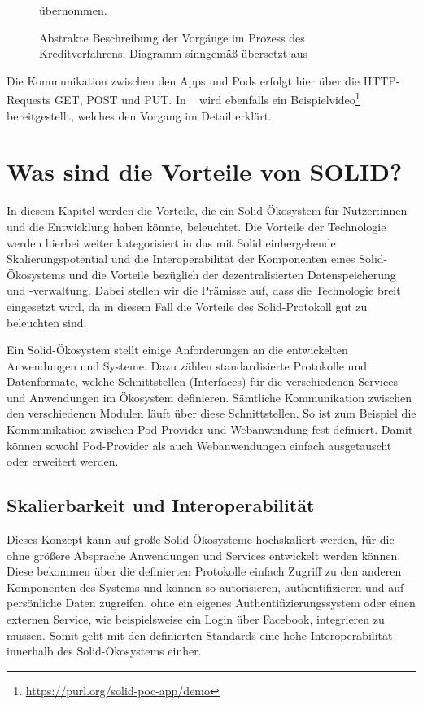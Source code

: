 \documentclass[acmtog]{acmart}
\begin{document}
\begin{figure}
\label{fig:enterprise_example}
\centering

\caption{Abstrakte Beschreibung der Vorgänge im Prozess des Kreditverfahrens. Diagramm sinngemäß übersetzt aus ~\cite{DBLP:conf/i-semantics/HenselmannKSS0H22}} übernommen.
\end{figure}

Die Kommunikation zwischen den Apps und Pods erfolgt hier über die HTTP-Requests GET, POST und PUT.
In ~\cite{DBLP:conf/i-semantics/HenselmannKSS0H22} wird ebenfalls ein Beispielvideo\footnote{\url{https://purl.org/solid-poc-app/demo}} bereitgestellt, welches den Vorgang im Detail erklärt.

\section{Was sind die Vorteile von SOLID?} \label{section:wasSindDieVorteileVonSolid}
 
In diesem Kapitel werden die Vorteile, die ein Solid-Ökosystem für Nutzer:innen und die Entwicklung haben könnte, beleuchtet. Die Vorteile der Technologie werden hierbei weiter kategorisiert in das mit Solid einhergehende Skalierungspotential und die Interoperabilität der Komponenten eines Solid-Ökosystems und die Vorteile bezüglich der dezentralisierten Datenspeicherung und -verwaltung. Dabei stellen wir die Prämisse auf, dass die Technologie breit eingesetzt wird, da in diesem Fall die Vorteile des Solid-Protokoll gut zu beleuchten sind.

Ein Solid-Ökosystem stellt einige Anforderungen an die entwickelten Anwendungen und Systeme. Dazu zählen standardisierte Protokolle und Datenformate, welche Schnittstellen (Interfaces) für die verschiedenen Services und Anwendungen im Ökosystem definieren. Sämtliche Kommunikation zwischen den verschiedenen Modulen läuft über diese Schnittstellen. So ist zum Beispiel die Kommunikation zwischen Pod-Provider und Webanwendung fest definiert. Damit können sowohl Pod-Provider als auch Webanwendungen einfach ausgetauscht oder erweitert werden. 

\subsection{Skalierbarkeit und Interoperabilität} \label{subsection:vorteile:skalierbarkeitUndInteroperabilität}

Dieses Konzept kann auf große Solid-Ökosysteme hochskaliert werden, für die ohne größere Absprache Anwendungen und Services entwickelt werden können. Diese bekommen über die definierten Protokolle einfach Zugriff zu den anderen Komponenten des Systems und können so autorisieren, authentifizieren und auf persönliche Daten zugreifen, ohne ein eigenes Authentifizierungssystem oder einen externen Service, wie beispielsweise ein Login über Facebook, integrieren zu müssen. Somit geht mit den definierten Standards eine hohe Interoperabilität innerhalb des Solid-Ökosystems einher.
\cite{8633673}
\end{document}
